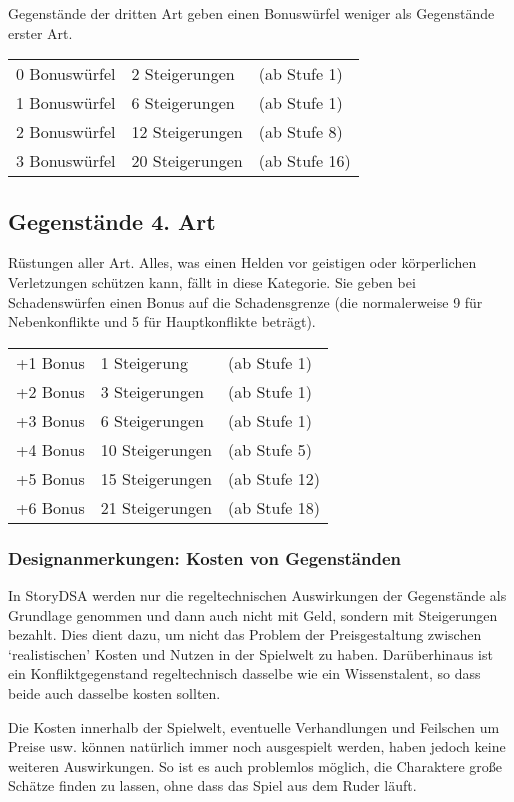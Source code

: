 Gegenstände der dritten Art geben einen Bonuswürfel weniger als Gegenstände erster Art.

\begin{tabular}[C]{lll}
  0 Bonuswürfel & 2 Steigerungen & (ab Stufe 1) \\
  1 Bonuswürfel & 6 Steigerungen & (ab Stufe 1) \\
  2 Bonuswürfel & 12 Steigerungen & (ab Stufe 8) \\
  3 Bonuswürfel & 20 Steigerungen & (ab Stufe 16) \\
\end{tabular}


\subsection{Gegenstände 4. Art}
Rüstungen aller Art. Alles, was einen Helden vor geistigen oder körperlichen Verletzungen schützen kann, fällt in diese Kategorie. Sie geben bei Schadenswürfen einen Bonus auf die Schadensgrenze (die normalerweise 9 für Nebenkonflikte und 5 für Hauptkonflikte beträgt).

\begin{tabular}{lll}
 +1 Bonus & 1 Steigerung  & (ab Stufe 1) \\
 +2 Bonus & 3 Steigerungen & (ab Stufe 1)  \\
 +3 Bonus & 6 Steigerungen & (ab Stufe 1)  \\
 +4 Bonus & 10 Steigerungen & (ab Stufe 5)  \\
 +5 Bonus & 15 Steigerungen & (ab Stufe 12)  \\
 +6 Bonus & 21 Steigerungen & (ab Stufe 18)  \\
\end{tabular}

\begin{design}
\subsubsection{Designanmerkungen: Kosten von Gegenständen}
In StoryDSA werden nur die regeltechnischen Auswirkungen der Gegenstände als Grundlage genommen und dann auch nicht mit Geld, sondern mit Steigerungen bezahlt. Dies dient dazu, um nicht das Problem der Preisgestaltung zwischen `realistischen' Kosten und Nutzen in der Spielwelt zu haben. Darüberhinaus ist ein Konfliktgegenstand regeltechnisch dasselbe wie ein Wissenstalent, so dass beide auch dasselbe kosten sollten.

Die Kosten innerhalb der Spielwelt, eventuelle Verhandlungen und Feilschen um Preise usw. können natürlich immer noch ausgespielt werden, haben jedoch keine weiteren Auswirkungen. So ist es auch problemlos möglich, die Charaktere große Schätze finden zu lassen, ohne dass das Spiel aus dem Ruder läuft.
\end{design}

